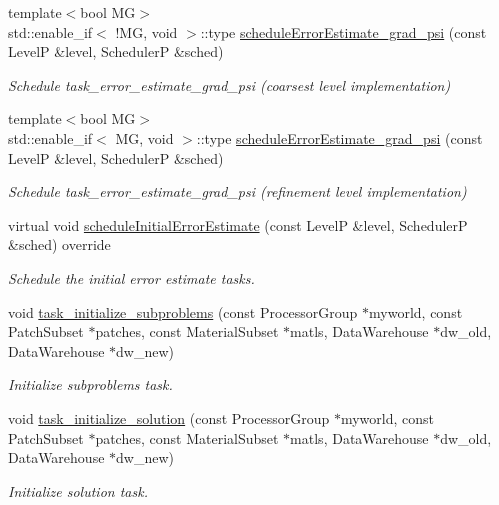 \begin{DoxyCompactItemize}
{\footnotesize template$<$bool MG$>$ }\\std\+::enable\+\_\+if$<$ !MG, void $>$\+::type \hyperlink{classUintah_1_1PhaseField_1_1PureMetal_a77fe2fdf1de3522b5eae6e25bde0f78c}{schedule\+Error\+Estimate\+\_\+grad\+\_\+psi} (const LevelP \&level, SchedulerP \&sched)
\begin{DoxyCompactList}\small\item\em Schedule task\+\_\+error\+\_\+estimate\+\_\+grad\+\_\+psi (coarsest level implementation) \end{DoxyCompactList}\item 
{\footnotesize template$<$bool MG$>$ }\\std\+::enable\+\_\+if$<$ MG, void $>$\+::type \hyperlink{classUintah_1_1PhaseField_1_1PureMetal_a77fe2fdf1de3522b5eae6e25bde0f78c}{schedule\+Error\+Estimate\+\_\+grad\+\_\+psi} (const LevelP \&level, SchedulerP \&sched)
\begin{DoxyCompactList}\small\item\em Schedule task\+\_\+error\+\_\+estimate\+\_\+grad\+\_\+psi (refinement level implementation) \end{DoxyCompactList}\item 
virtual void \hyperlink{classUintah_1_1PhaseField_1_1PureMetal_a79a12af978b8d0d9604e6e7be725ffbe}{schedule\+Initial\+Error\+Estimate} (const LevelP \&level, SchedulerP \&sched) override
\begin{DoxyCompactList}\small\item\em Schedule the initial error estimate tasks. \end{DoxyCompactList}\item 
void \hyperlink{classUintah_1_1PhaseField_1_1PureMetal_ae6736eefab5c30d04359ad04598d1a83}{task\+\_\+initialize\+\_\+subproblems} (const Processor\+Group $\ast$myworld, const Patch\+Subset $\ast$patches, const Material\+Subset $\ast$matls, Data\+Warehouse $\ast$dw\+\_\+old, Data\+Warehouse $\ast$dw\+\_\+new)
\begin{DoxyCompactList}\small\item\em Initialize subproblems task. \end{DoxyCompactList}\item 
void \hyperlink{classUintah_1_1PhaseField_1_1PureMetal_a2319dd2e72eab1e5e2c39c0dbd6170b4}{task\+\_\+initialize\+\_\+solution} (const Processor\+Group $\ast$myworld, const Patch\+Subset $\ast$patches, const Material\+Subset $\ast$matls, Data\+Warehouse $\ast$dw\+\_\+old, Data\+Warehouse $\ast$dw\+\_\+new)
\begin{DoxyCompactList}\small\item\em Initialize solution task. \end{DoxyCompactList}\item 

\end{DoxyCompactItemize}
